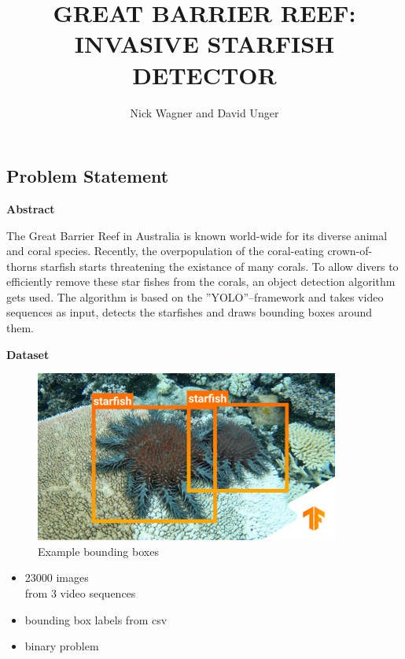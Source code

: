 \documentclass[landscape,a2,final,12pt]{issposter}
\title{\MakeUppercase{Great Barrier Reef: Invasive Starfish Detector}}
\author{Nick Wagner and David Unger}
\institute{Institute of Signal Processing and System Theory, University of Stuttgart, Germany}
\begin{document}
\maketitle

\raggedright
\begin{multicols}{3}

\section{Problem Statement}
    \textbf{Abstract}\\
    \begin{small} The Great Barrier Reef in Australia is known world-wide for its diverse animal and coral species.
        Recently, the overpopulation of the coral-eating crown-of-thorns starfish starts threatening the existance of many corals.
        To allow divers to efficiently remove these star fishes from the corals, an object detection algorithm gets used. \newline
        The algorithm is based on the ''YOLO''--framework and takes video sequences as input, detects the starfishes and draws bounding boxes around them.\\
    \end{small}
    \vspace{0.5cm}
    \textbf{Dataset}
    \begin{figure}
    \centering
        \includegraphics[scale=0.8]{1_starfishes.png}
        \caption{Example bounding boxes}
    \end{figure} 
    \vspace*{-0.5cm}
    \begin{small}
    \begin{itemize}
        \item \raisebox{-0.6ex}{\~{}}23000 images\\ from 3 video sequences
        \item bounding box labels from csv
        \item binary problem
    \end{itemize}
    \end{small}
    \vspace*{2cm}
    \columnbreak

\end{multicols}
\end{document}
